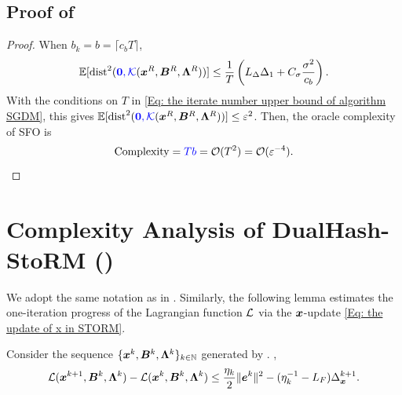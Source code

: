 \subsection{Proof of }
\label{app:stom-oracle-proof}
\begin{proof}
    When $b_{k}= b = \lceil c_{b}T\rceil$, 
    \[
        \mathbb{E}[\mathrm{dist}^{2}({\color{blue}\bm{0}, \mathcal K}(\bm{x}^{R}, \bm{B}^{R}
        , \bm{\Lambda}^{R}))] \leq \frac{1}{T}\left( L_{\Delta}\Delta_{1}+ C_{\sigma}
        \frac{\sigma^{2}}{c_{b}}\right).
    \]
    With the conditions on $T$ in \eqref{Eq: the iterate number upper bound of algorithm SGDM},
    this gives
    $\mathbb{E}[\mathrm{dist}^{2}({\color{blue}\bm{0}, \mathcal K}(\bm{x}^{R}, \bm{B}^{R}
    , \bm{\Lambda}^{R}))] \leq \varepsilon^{2}$. Then, the oracle complexity
    of SFO is
    \[
        \text{Complexity}= {\color{blue}Tb}=\mathcal{O}(T^{2}) = \mathcal{O}(\varepsilon^{-4}).
    \]
\end{proof}

\section{Complexity Analysis of DualHash-StoRM (\texorpdfstring{}{Algorithm 2})}
\label{app:storm-complexity}
We adopt the same notation as in . 
Similarly, the following lemma estimates the one-iteration progress
of the Lagrangian function $\mathcal{L}$ via the $\bm{x}$-update \eqref{Eq: the update of x in STORM}. 
\begin{lemma}
    \label{app:storm-primal-progress-proof}
\label{Lemma: One-iteration progress of x in STORM} Consider the sequence $\{\bm{x}^k, \bm{B}^k, \bm{\Lambda}^k\}_{k \in \mathbb{N}}$ generated by .  ,
    \begin{align}
        \label{Eq: the recursive relation of L on x}\calL (\bx^{k+1}, \bB^{k}, \bLmbd^{k}) - \calL (\bx^{k}, \bB^{k}, \bLmbd^{k}) \leq \frac{\eta_{k}}{2}\| \be^{k}\|^{2}- (\eta_{k}^{-1}- L_{F})\Delta_{\bx}^{k+1}.
    \end{align}
\end{lemma}

